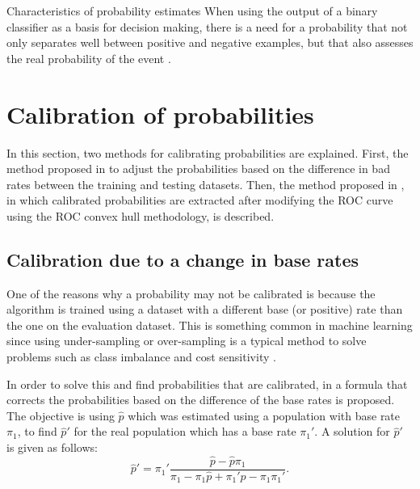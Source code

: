 \begin{remark}{Characteristics of probability estimates}
When using the output of a binary classifier as a basis for decision making, there is a 
need for a probability that not only separates well between positive and negative examples, but 
that also assesses the real probability of the event \citep{cohen2004}.
\end{remark}


\section{Calibration of probabilities}
\label{sec:6:prob}

In this section, two methods for calibrating probabilities are explained. First, the method proposed 
in \citep{Elkan2001} to adjust the probabilities based on the   difference in bad rates  between the 
training and testing datasets.  Then, the method proposed in \cite{Hernandez-Orallo2012}, in which 
calibrated probabilities are extracted after modifying the ROC curve using the ROC convex hull 
methodology, is described.
 
\subsection{Calibration due to a change in base rates}

One of the reasons why a probability may not be calibrated is because the algorithm is trained 
using a dataset with a different base (or positive) rate than the one on the evaluation dataset.  
This is something common in machine learning since using under-sampling or over-sampling is a 
typical method to solve problems such as class imbalance and cost sensitivity \citep{Hulse2007}.
  
In order to solve this and find probabilities that are calibrated, in \citep{Elkan2001} a formula  
that corrects the probabilities based on the difference of the base rates is proposed.  The 
objective is using $\hat p$ which was estimated using a population with base rate $\pi_1$,
to find $\hat p'$ for the real population which has a base rate $\pi_1'$. A solution for $\hat p'$ 
is given as follows:
\begin{equation}
  \hat p'=\pi_1' \frac{\hat p - \hat p \pi_1}{\pi_1- \pi_1 \hat p +\pi_1' \hat p - \pi_1 \pi_1'}.
\end{equation}

  
